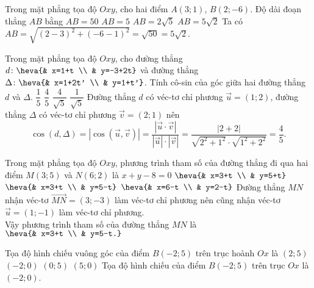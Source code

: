 \begin{ex}%
	Trong mặt phẳng tọa độ $Oxy$, cho hai điểm $A(3;1)$, $B(2;-6)$. Độ dài đoạn thẳng $AB$ bằng
	\choice
	{$AB=50$}
	{$AB=5$}
	{$AB=2\sqrt{5}$}
	{\True $AB=5\sqrt{2}$}
	\loigiai
	{Ta có $AB=\sqrt{(2-3)^2+(-6-1)^2} = \sqrt{50} = 5\sqrt{2}$.}
\end{ex}

\begin{ex}%
	Trong mặt phẳng tọa độ $Oxy$, cho đường thẳng $d\colon \heva{& x=1+t \\ & y=-3+2t}$ và đường thẳng $\Delta\colon \heva{& x=1+2t' \\ & y=1+t'}$. Tính cô-sin của góc giữa hai đường thẳng $d$ và $\Delta$.
	\choice
	{$\dfrac{1}{5}$}
	{\True $\dfrac{4}{5}$}
	{$\dfrac{4}{\sqrt{5}}$}
	{$\dfrac{1}{\sqrt{5}}$}
		\loigiai
	{Đường thẳng $d$ có véc-tơ chỉ phương $\overrightarrow{u}=(1;2)$, đường thẳng $\Delta$ có véc-tơ chỉ phương $\overrightarrow{v}=(2;1)$ nên
		$$\cos\left(d,\Delta\right) = \left| \cos\left(\overrightarrow{u}, \overrightarrow{v}\right) \right| = \dfrac{\left| \overrightarrow{u} \cdot \overrightarrow{v}\right|}{\left| \overrightarrow{u} \right| \cdot \left| \overrightarrow{v}\right|} = \dfrac{\left| 2+2\right|}{\sqrt{2^2+1^2} \cdot \sqrt{1^2+2^2}} = \dfrac{4}{5}.$$}
\end{ex}

\begin{ex}%
	Trong mặt phẳng tọa độ $Oxy$, phương trình tham số của đường thẳng đi qua hai điểm $M(3;5)$ và $N(6;2)$ là
	\choice
	{$x+y-8=0$}
	{$\heva{& x=3+t \\ & y=5+t}$}
	{\True $\heva{& x=3+t \\ & y=5-t}$}
	{$\heva{& x=6-t \\ & y=2-t}$}
	\loigiai
	{Đường thẳng $MN$ nhận véc-tơ $\overrightarrow{MN}=(3;-3)$ làm véc-tơ chỉ phương nên cũng nhận véc-tơ $\overrightarrow{u}=(1;-1)$ làm véc-tơ chỉ phương.\\
		Vậy phương trình tham số của đường thẳng $MN$ là $\heva{& x=3+t \\ & y=5-t.}$}
\end{ex}


\begin{ex}%
	Tọa độ hình chiếu vuông góc của điểm $B(-2;5)$ trên trục hoành $Ox$ là
	\choice
	{$(2;5)$}
	{\True $(-2;0)$}
	{$(0;5)$}
	{$(5;0)$}
	\loigiai
	{Tọa độ hình chiếu của điểm $B(-2;5)$ trên trục $Ox$ là $(-2;0)$.}
\end{ex}


